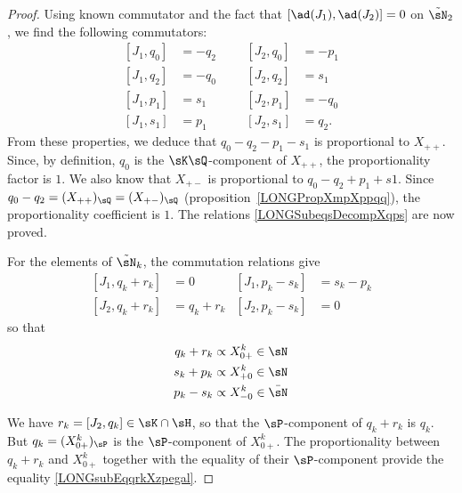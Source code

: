 \begin{proof}


	Using known commutator and the fact that $[\ad(J_1),\ad(J_2)]=0$ on $\tilde\sN_2$, we find the following commutators:
	\begin{subequations}
		\begin{align}
			[J_1,q_0] & =-q_2 &  &  & [J_2,q_0] & =-p_1			\label{LONGsubEqJunqzJdeuxqzmoinspun}  \\
			[J_1,q_2] & =-q_0 &  &  & [J_2,q_2] & =s_1\label{LONGsubEqJunqzJdeuxqzmoinspdeux} \\
			[J_1,p_1] & =s_1  &  &  & [J_2,p_1] & =-q_0                                       \\
			[J_1,s_1] & =p_1  &  &  & [J_2,s_1] & =q_2.
		\end{align}
	\end{subequations}
	From these properties, we deduce that $q_0-q_2-p_1-s_1$ is proportional to $X_{++}$. Since, by definition, $q_0$ is the $\sK\sQ$-component of $X_{++}$, the proportionality factor is $1$. We also know that  $X_{+-}$ is proportional to $q_0-q_2+p_1+s1$. Since $q_0-q_2=(X_{++})_{\sQ}=(X_{+-})_{\sQ}$ (proposition~\ref{LONGPropXmpXppqq}), the proportionality coefficient is $1$. The relations \eqref{LONGSubeqsDecompXqps} are now proved.

	For the elements of $\tilde\sN_k$, the commutation relations give
	\begin{subequations}
		\begin{align}
			[J_1,q_k+r_k] & =0       & [J_1,p_k-s_k] & =s_k-p_k \\
			[J_2,q_k+r_k] & =q_k+r_k & [J_2,p_k-s_k] & =0
		\end{align}
	\end{subequations}
	so that
	\begin{equation}
		\begin{aligned}[]
			q_k+r_k & \propto X_{0+}^k\in\sN     \\
			s_k+p_k & \propto X^k_{+0}\in\sN     \\
			p_k-s_k & \propto X^k_{-0}\in\bar\sN
		\end{aligned}
	\end{equation}

	We have $r_k=[J_2,q_k]\in\sK\cap\sH$, so that the $\sP$-component of $q_k+r_k$ is $q_k$. But $q_k=(X_{0+}^k)_{\sP}$ is the $\sP$-component of $X_{0+}^k$. The proportionality between $q_k+r_k$ and $X_{0+}^k$ together with the equality of their $\sP$-component provide the equality \eqref{LONGsubEqqrkXzpegal}.


\end{proof}
